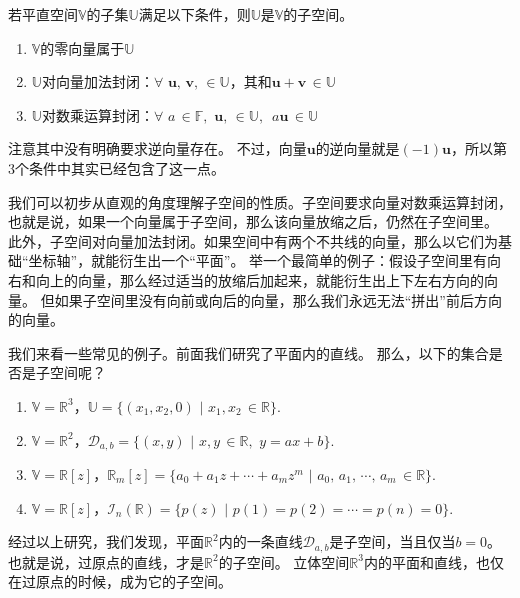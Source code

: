 \documentclass[12pt,UTF8,fontset=none]{ctexbook}
\begin{document}
\begin{pp}\label{pp:1_6}
    若平直空间$\mathbb{V}$的子集$\mathbb{U}$满足以下条件，则$\mathbb{U}$是$\mathbb{V}$的子空间。
    \begin{enumerate}
        \item $\mathbb{V}$的零向量属于$\mathbb{U}$
        \item $\mathbb{U}$对向量加法封闭：$\forall \,\, \mathbf{u}, \, \mathbf{v}, \, \in \mathbb{U}$，其和$\mathbf{u} + \mathbf{v} \, \in \mathbb{U}$
        \item $\mathbb{U}$对数乘运算封闭：$\forall \,\, a \, \in \mathbb{F}, \,\, \mathbf{u}, \, \in \mathbb{U}, \,\,\, a\mathbf{u} \, \in \mathbb{U}$
    \end{enumerate}
\end{pp}

注意其中没有明确要求逆向量存在。
不过，向量$\mathbf{u}$的逆向量就是$(-1)\mathbf{u}$，所以第3个条件中其实已经包含了这一点。

我们可以初步从直观的角度理解子空间的性质。子空间要求向量对数乘运算封闭，也就是说，如果一个向量属于子空间，那么该向量放缩之后，仍然在子空间里。
此外，子空间对向量加法封闭。如果空间中有两个不共线的向量，那么以它们为基础“坐标轴”，就能衍生出一个“平面”。
举一个最简单的例子：假设子空间里有向右和向上的向量，那么经过适当的放缩后加起来，就能衍生出上下左右方向的向量。
但如果子空间里没有向前或向后的向量，那么我们永远无法“拼出”前后方向的向量。

我们来看一些常见的例子。前面我们研究了平面内的直线。
那么，以下的集合是否是子空间呢？
\begin{enumerate}
    \item $\mathbb{V} = \mathbb{R}^3$，$\mathbb{U} = \{(x_1, x_2, 0) \,\, | \,\, x_1, x_2 \, \in \mathbb{R}\}$.
    \item $\mathbb{V} = \mathbb{R}^2$，$\mathcal{D}_{a,b} = \{(x, y) \,\, | \,\, x, y \, \in \mathbb{R}, \,\, y = ax + b\}$.
    \item $\mathbb{V} = \mathbb{R}[z]$，$\mathbb{R}_m[z] = \{a_0 + a_1 z + \cdots + a_m z^m \,\, | \,\, a_0,\, a_1,\, \cdots ,\, a_m \, \in \mathbb{R}\}$.
    \item $\mathbb{V} = \mathbb{R}[z]$，$\mathcal{I}_n (\mathbb{R}) = \{p(z) \,\, | \,\, p(1) = p(2) = \cdots = p(n) = 0 \}$.
\end{enumerate}

经过以上研究，我们发现，平面$\mathbb{R}^2$内的一条直线$\mathcal{D}_{a,b}$是子空间，当且仅当$b = 0$。
也就是说，过原点的直线，才是$\mathbb{R}^2$的子空间。
立体空间$\mathbb{R}^3$内的平面和直线，也仅在过原点的时候，成为它的子空间。
\end{document}

